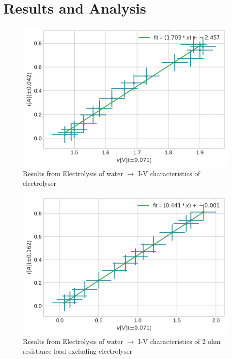 \documentclass{article}
\begin{document}
    \section{Results and Analysis}
    \begin{figure}
        \centering
        \includegraphics[scale=0.9]{./gone.png}
        \caption{Results from Electrolysis of water \(\rightarrow\) I-V characteristics of electrolyser}
    \end{figure}
    \begin{figure}
        \centering
        \includegraphics[scale=0.9]{./gtwo.png}
        \caption{Results from Electrolysis of water \(\rightarrow\) I-V characteristics of 2 ohm resistance load excluding electrolyser}
    \end{figure}
\end{document}
